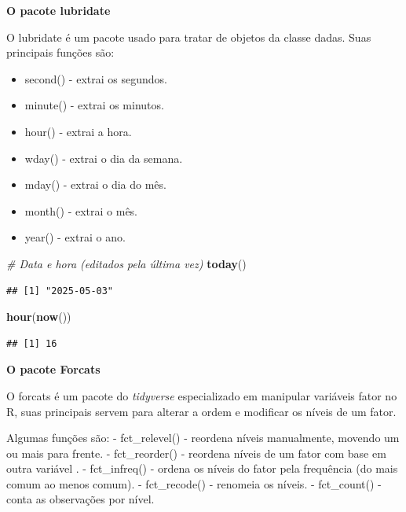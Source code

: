 \documentclass[
]{book}
\newenvironment{Shaded}{\begin{snugshade}}{\end{snugshade}}
\newcommand{\CommentTok}[1]{\textcolor[rgb]{0.56,0.35,0.01}{\textit{#1}}}
\newcommand{\FunctionTok}[1]{\textcolor[rgb]{0.13,0.29,0.53}{\textbf{#1}}}
\newcommand{\NormalTok}[1]{#1}
\providecommand{\tightlist}{%
  \setlength{\itemsep}{0pt}\setlength{\parskip}{0pt}}
\begin{document}
\textbf{O pacote lubridate}

O lubridate é um pacote usado para tratar de objetos da classe dadas. Suas principais funções são:

\begin{itemize}
\tightlist
\item
  second() - extrai os segundos.
\item
  minute() - extrai os minutos.
\item
  hour() - extrai a hora.
\item
  wday() - extrai o dia da semana.
\item
  mday() - extrai o dia do mês.
\item
  month() - extrai o mês.
\item
  year() - extrai o ano.
\end{itemize}

\begin{Shaded}
\begin{Highlighting}[]
\CommentTok{\# Data e hora (editados pela última vez)}
\FunctionTok{today}\NormalTok{()}
\end{Highlighting}
\end{Shaded}

\begin{verbatim}
## [1] "2025-05-03"
\end{verbatim}

\begin{Shaded}
\begin{Highlighting}[]
\FunctionTok{hour}\NormalTok{(}\FunctionTok{now}\NormalTok{())}
\end{Highlighting}
\end{Shaded}

\begin{verbatim}
## [1] 16
\end{verbatim}

\textbf{O pacote Forcats}

O forcats é um pacote do \emph{tidyverse} especializado em manipular variáveis fator no R, suas principais servem para alterar a ordem e modificar os níveis de um fator.

Algumas funções são:
- fct\_relevel() - reordena níveis manualmente, movendo um ou mais para frente.
- fct\_reorder() - reordena níveis de um fator com base em outra variável .
- fct\_infreq() - ordena os níveis do fator pela frequência (do mais comum ao menos comum).
- fct\_recode() - renomeia os níveis.
- fct\_count() - conta as observações por nível.
\end{document}
